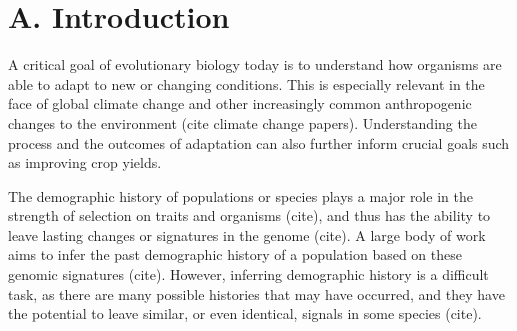 
\begin{center}
\end{center}






\section*{A. Introduction}

A critical goal of evolutionary biology today is to understand how organisms are able to adapt to new or changing conditions. This is especially relevant in the face of global climate change and other increasingly common anthropogenic changes to the environment (cite climate change papers). Understanding the process and the outcomes of adaptation can also further inform crucial goals such as improving crop yields.

The demographic history of populations or species plays a major role in the strength of selection on traits and organisms (cite), and thus has the ability to leave lasting changes or signatures in the genome (cite). A large body of work aims to infer the past demographic history of a population based on these genomic signatures (cite). However, inferring demographic history is a difficult task, as there are many possible histories that may have occurred, and they have the potential to leave similar, or even identical, signals in some species (cite).

